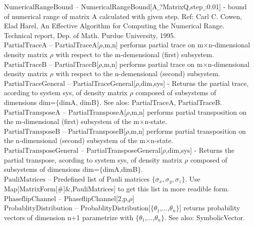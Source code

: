 \documentclass[a4paper,11pt]{article}
\begin{document}
\textbf{$ \text{NumericalRangeBound} $ }-- NumericalRangeBound[A$\_$?MatrixQ,step$\_$:0.01] - bound of numerical range of matrix A calculated with given step. Ref: Carl C. Cowen, Elad Harel, An Effective Algorithm for Computing the Numerical Range. Technical report, Dep. of Math. Purdue University, 1995.$  $\\

\textbf{$ \text{PartialTraceA} $ }-- PartialTraceA[$\rho $,m,n] performs partial trace on m$\times $n-dimensional density matrix $\rho $ with respect to the m-demensional (first) subsystem.$  $\\

\textbf{$ \text{PartialTraceB} $ }-- PartialTraceB[$\rho $,m,n] performs partial trace on m$\times $n-dimensional density matrix $\rho $ with respect to the n-demensional (second) subsystem.$  $\\

\textbf{$ \text{PartialTraceGeneral} $ }-- PartialTraceGeneral[$\rho $,dim,sys] - Returns the partial trace, acording to system sys, of density matrix $\rho $ composed of subsystems of dimensions dim=$\{$dimA, dimB$\}$. See alos: PartialTraceA, PartialTraceB.$  $\\

\textbf{$ \text{PartialTransposeA} $ }-- PartialTransposeA[$\rho $,m,n] performs partial transposition on the m-dimensional (first) subsystem of the m$\times $n-state.$  $\\

\textbf{$ \text{PartialTransposeB} $ }-- PartialTransposeB[$\rho $,m,n] performs partial transposition on the n-dimensional (second) subsystem of the m$\times $n-state.$  $\\

\textbf{$ \text{PartialTransposeGeneral} $ }-- PartialTransposeGeneral[$\rho $,dim,sys] - Returns the partial transpose, acording to system sys, of density matrix $\rho $ composed of subsystems of dimensions dim=$\{$dimA,dimB$\}$. $  $\\

\textbf{$ \text{PauliMatrices} $ }-- Predefined list of Pauli matrices $\{$$ \sigma _x,\sigma _y,\sigma _z $$\}$. Use Map[MatrixForm[$\#$]$\&$,PauliMatrices] to get this list in more readible form.$  $\\

\textbf{$ \text{PhaseflipChannel} $ }-- PhaseflipChannel[2,p,$\rho $]$  $\\

\textbf{$ \text{ProbablityDistribution} $ }-- ProbablityDistribution[$\{$$ \theta _1 $,...,$ \theta _n $$\}$] returns probability vectors of dimension n+1 parametrize with $\{$$ \theta _1 $,...,$ \theta _n $$\}$. See also: SymbolicVector.$  $\\
\end{document}
